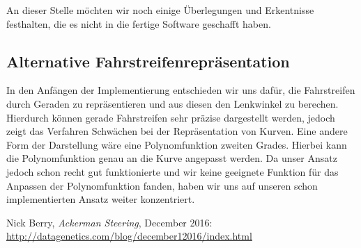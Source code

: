 \documentclass[a4paper,12pt]{report}
\begin{document}
	An dieser Stelle möchten wir noch einige Überlegungen und Erkentnisse festhalten,
	die es nicht in die fertige Software geschafft haben.
	
\subsection{Alternative Fahrstreifenrepräsentation}

	In den Anfängen der Implementierung entschieden wir uns dafür, die Fahrstreifen durch Geraden zu repräsentieren und aus diesen den Lenkwinkel zu berechen. Hierdurch können gerade Fahrstreifen sehr präzise dargestellt werden, jedoch zeigt das Verfahren Schwächen bei der Repräsentation von Kurven. Eine andere Form der Darstellung wäre eine Polynomfunktion zweiten Grades. Hierbei kann die Polynomfunktion genau an die Kurve angepasst werden. Da unser Ansatz jedoch schon recht gut funktionierte und wir keine geeignete Funktion für das Anpassen der Polynomfunktion fanden, haben wir uns auf unseren schon implementierten Ansatz weiter konzentriert.


\begin{thebibliography}{9}
	
	Nick Berry,
	\textit{Ackerman Steering},
	December 2016:
	\url{http://datagenetics.com/blog/december12016/index.html}
	
	
	
\end{thebibliography}
\end{document}
